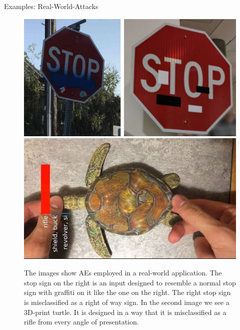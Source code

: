 \documentclass[11pt,compress,t,notes=noshow, xcolor=table]{beamer}
\begin{document}
\begin{vbframe}{Examples: Real-World-Attacks}
\begin{figure}[h]
\centering
\includegraphics[width=0.46\linewidth]{slides/local-explanations/figure/AEstop.png}\quad \includegraphics[width=0.45\linewidth]{slides/local-explanations/figure/AEturtle.jpg}
  \caption{The images show AEs employed in a real-world application. The stop sign on the right is an input designed to resemble a normal stop sign with graffiti on it like the one on the right. The right stop sign is misclassified as a right of way sign. In the second image we see a 3D-print turtle. It is designed in a way that it is misclassified as a rifle from every angle of presentation.}
  \label{fig:mnist}
\end{figure} 


\end{vbframe}
\end{document}
